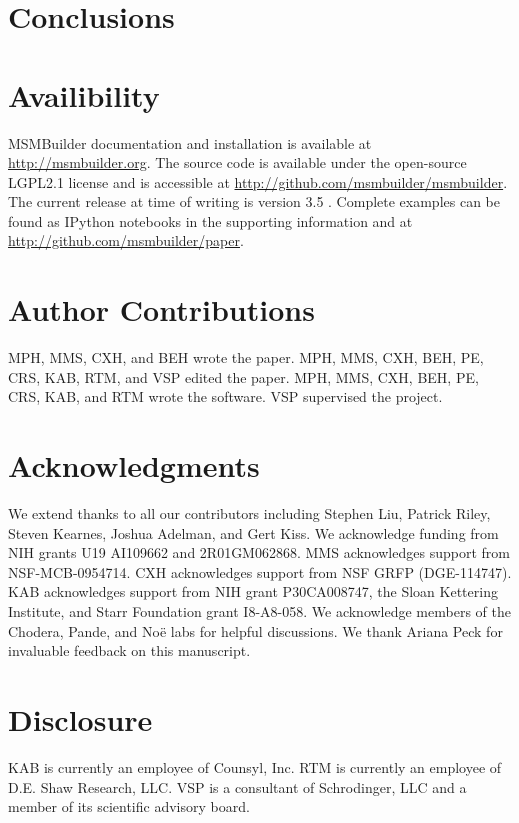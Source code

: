 \documentclass[superscriptaddress,nofootinbib,twocolumn]{revtex4-1}
\begin{document}
\section{Conclusions}
\label{sec:conclusion}


\section{Availibility}

MSMBuilder documentation and installation is available at
\url{http://msmbuilder.org}. The source code is available under the
open-source LGPL2.1 license and is accessible at
\url{http://github.com/msmbuilder/msmbuilder}.
The current release at time of writing is version 3.5 \cite{2016-msmbuilder3.5-zenodo}. 
Complete examples can be
found as IPython notebooks in the supporting information and at
\url{http://github.com/msmbuilder/paper}.

\section{Author Contributions}

MPH, MMS, CXH, and BEH wrote the paper.
MPH, MMS, CXH, BEH, PE, CRS, KAB, RTM, and VSP edited the paper.
MPH, MMS, CXH, BEH, PE, CRS, KAB, and RTM wrote the software.
VSP supervised the project.

\section{Acknowledgments}

We extend thanks to all our contributors including
Stephen Liu, Patrick Riley, Steven Kearnes, Joshua Adelman, and Gert Kiss.
We acknowledge funding from NIH grants U19 AI109662 and 2R01GM062868.
MMS acknowledges support from NSF-MCB-0954714.
CXH acknowledges support from NSF GRFP (DGE-114747).
KAB acknowledges support from NIH grant P30CA008747, the Sloan Kettering
Institute, and Starr Foundation grant I8-A8-058.
We acknowledge members of the Chodera, Pande, and No\"{e} labs for helpful
discussions. We thank Ariana Peck for invaluable feedback on this manuscript.

\section{Disclosure}
KAB is currently an employee of Counsyl, Inc.
RTM is currently an employee of D.E. Shaw Research, LLC.
VSP is a consultant of Schrodinger, LLC and a member of its scientific
  advisory board.


\end{document}
